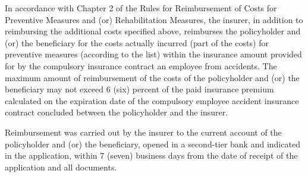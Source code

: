 \begin{multicols}{2}
In accordance with Chapter 2 of the Rules for Reimbursement of Costs for
Preventive Measures and (or) Rehabilitation Measures, the insurer, in
addition to reimbursing the additional costs specified above, reimburses
the policyholder and (or) the beneficiary for the costs actually
incurred (part of the costs) for preventive measures (according to the
list) within the insurance amount provided for by the compulsory
insurance contract an employee from accidents. The maximum amount of
reimbursement of the costs of the policyholder and (or) the beneficiary
may not exceed 6 (six) percent of the paid insurance premium calculated
on the expiration date of the compulsory employee accident insurance
contract concluded between the policyholder and the insurer.

Reimbursement was carried out by the insurer to the current account of
the policyholder and (or) the beneficiary, opened in a second-tier bank
and indicated in the application, within 7 (seven) business days from
the date of receipt of the application and all documents.
\end{multicols}


